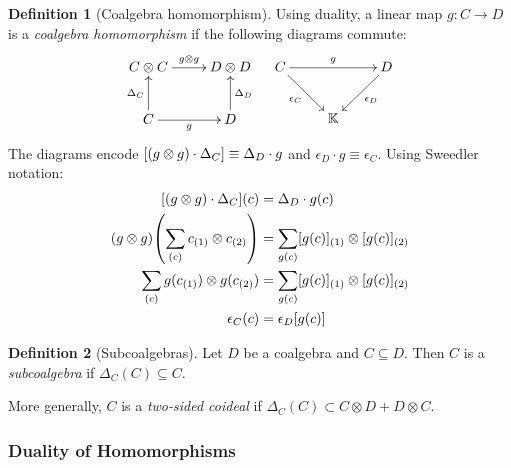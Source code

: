 \documentclass{article}
\theoremstyle{definition}
\newtheorem{Definition}{Definition}
\theoremstyle{remark}
\theoremstyle{underline}
\theoremstyle{underline}
\begin{document}
	\begin{Definition}[Coalgebra homomorphism]
		Using duality, a linear map $g\colon C \to D$ is a \emph{coalgebra homomorphism} if the following diagrams commute:
		\begin{align*}
			\xymatrix{
				C \otimes C \ar[r]^-{g \otimes g} & D \otimes D \\
				C \ar[u]^-{\Delta_C} \ar[r]_-{g} & D \ar[u]_-{\Delta_D} 
			} & &
			\xymatrix{
				C \ar[rr]^-{g} \ar[rd]_-{\epsilon_C} & & D \ar[ld]^-{\epsilon_D} \\
				& \mathbb K & 
			}
		\end{align*}
		The diagrams encode $\bqty{(g \otimes g)\cdot \Delta_C} \equiv \Delta_D\cdot g$ and $\epsilon_D \cdot g \equiv \epsilon_C$. Using Sweedler notation:
		\begin{align*}
			\bqty{(g \otimes g)\cdot \Delta_C}(c) & = \Delta_D\cdot g(c) \\
			\pqty{g \otimes g} \pqty{\sum_{(c)} c_{(1)} \otimes c_{(2)}} & = \sum_{g(c)} [g(c)]_{(1)} \otimes [g(c)]_{(2)} \\
			\sum_{(c)} g(c_{(1)}) \otimes g(c_{(2)}) & = \sum_{g(c)} [g(c)]_{(1)} \otimes [g(c)]_{(2)} \\
			\epsilon_C(c) & = \epsilon_D[g(c)]
		\end{align*}
	\end{Definition}

	\begin{Definition}[Subcoalgebras]
		Let $D$ be a coalgebra and $C \subseteq D$. Then $C$ is a \emph{subcoalgebra} if $\Delta_C(C) \subseteq C$.
	\end{Definition}
	More generally, $C$ is a \emph{two-sided coideal} if $\Delta_C(C) \subset C \otimes D + D \otimes C$.

	\subsubsection{Duality of Homomorphisms}
\end{document}
